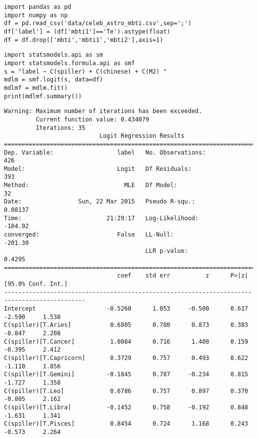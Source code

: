 \documentclass[12pt,fleqn]{article}\usepackage{../common}
\begin{document}
\begin{verbatim}
import pandas as pd
import numpy as np
df = pd.read_csv('data/celeb_astro_mbti.csv',sep=';')
df['label'] = (df['mbti1']=='Te').astype(float)
df = df.drop(['mbti','mbti1','mbti2'],axis=1)
\end{verbatim}


\begin{verbatim}
import statsmodels.api as sm
import statsmodels.formula.api as smf
s = "label ~ C(spiller) + C(chinese) + C(M2) "
mdlm = smf.logit(s, data=df)
mdlmf = mdlm.fit()
print(mdlmf.summary())
\end{verbatim}

\begin{verbatim}
Warning: Maximum number of iterations has been exceeded.
         Current function value: 0.434079
         Iterations: 35
                           Logit Regression Results                           
==============================================================================
Dep. Variable:                  label   No. Observations:                  426
Model:                          Logit   Df Residuals:                      393
Method:                           MLE   Df Model:                           32
Date:                Sun, 22 Mar 2015   Pseudo R-squ.:                 0.08137
Time:                        21:29:17   Log-Likelihood:                -184.92
converged:                      False   LL-Null:                       -201.30
                                        LLR p-value:                    0.4295
=============================================================================================
                                coef    std err          z      P>|z|      [95.0% Conf. Int.]
---------------------------------------------------------------------------------------------
Intercept                    -0.5260      1.053     -0.500      0.617        -2.590     1.538
C(spiller)[T.Aries]           0.6805      0.780      0.873      0.383        -0.847     2.208
C(spiller)[T.Cancer]          1.0084      0.716      1.408      0.159        -0.395     2.412
C(spiller)[T.Capricorn]       0.3729      0.757      0.493      0.622        -1.110     1.856
C(spiller)[T.Gemini]         -0.1845      0.787     -0.234      0.815        -1.727     1.358
C(spiller)[T.Leo]             0.6786      0.757      0.897      0.370        -0.805     2.162
C(spiller)[T.Libra]          -0.1452      0.758     -0.192      0.848        -1.631     1.341
C(spiller)[T.Pisces]          0.8454      0.724      1.168      0.243        -0.573     2.264

\end{verbatim}
\end{document}
